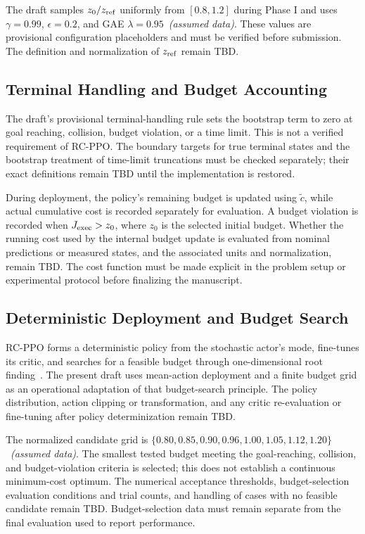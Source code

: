 \documentclass{article}
\begin{document}
The draft samples $z_0/z_{\rm ref}$ uniformly from $[0.8,1.2]$ during Phase I and
uses $\gamma=0.99$, $\epsilon=0.2$, and GAE $\lambda=0.95$~\textit{(assumed data)}.
These values are provisional configuration placeholders and must be verified before
submission. The definition and normalization of $z_{\rm ref}$ remain \textsc{TBD}.

\subsection{Terminal Handling and Budget Accounting}
\label{app:termination_budget}
The draft's provisional terminal-handling rule sets the bootstrap term to zero at
goal reaching, collision, budget violation, or a time limit. This is not a verified
requirement of RC-PPO. The boundary targets for true terminal states and the
bootstrap treatment of time-limit truncations must be checked separately; their
exact definitions remain \textsc{TBD} until the implementation is restored.

During deployment, the policy's remaining budget is updated using $\tilde c$,
while actual cumulative cost is recorded separately for evaluation. A budget
violation is recorded when $J_{\rm exec}>z_0$, where $z_0$ is the selected initial
budget. Whether the running cost used by the internal budget update is evaluated
from nominal predictions or measured states, and the associated units and
normalization, remain \textsc{TBD}. The cost function must be made explicit in the
problem setup or experimental protocol before finalizing the manuscript.

\subsection{Deterministic Deployment and Budget Search}
\label{app:deployment_search}
RC-PPO forms a deterministic policy from the stochastic actor's mode, fine-tunes
its critic, and searches for a feasible budget through one-dimensional
root finding~\citep{so2024}. The present draft uses mean-action deployment and
a finite budget grid as an operational adaptation of that budget-search principle.
The policy distribution, action clipping or transformation, and any critic
re-evaluation or fine-tuning after policy determinization remain \textsc{TBD}.

The normalized candidate grid is
$\{0.80,0.85,0.90,0.96,1.00,1.05,1.12,1.20\}$~\textit{(assumed data)}.
The smallest tested budget meeting the goal-reaching, collision, and
budget-violation criteria is selected; this does not establish a continuous
minimum-cost optimum. The numerical acceptance thresholds, budget-selection
evaluation conditions and trial counts, and handling of cases with no feasible
candidate remain \textsc{TBD}. Budget-selection data must remain separate from
the final evaluation used to report performance.
\end{document}
